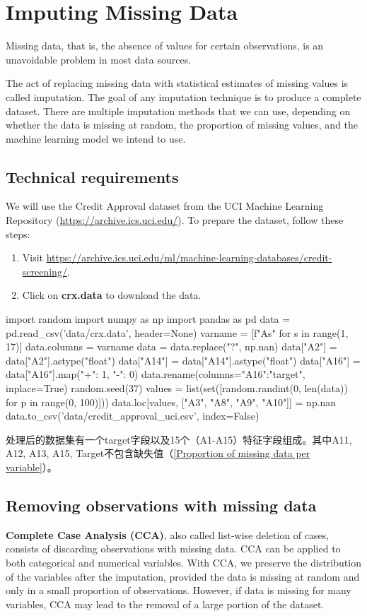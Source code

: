 \chapter{Imputing Missing Data}
Missing data, that is, the absence of values for certain observations, is an unavoidable problem in most data sources.

The act of replacing missing data with statistical estimates of missing values is called imputation.
The goal of any imputation technique is to produce a complete dataset. There are multiple imputation
methods that we can use, depending on whether the data is missing at random, the proportion of
missing values, and the machine learning model we intend to use.

\section{Technical requirements\label{credit_approval_uci}}
We will use the Credit Approval dataset from the UCI Machine Learning Repository (\url{https://archive.ics.uci.edu/}). To prepare the dataset, follow these steps:
\begin{enumerate}
    \item Visit \url{https://archive.ics.uci.edu/ml/machine-learning-databases/credit-screening/}.
    \item Click on \textbf{crx.data} to download the data.
\end{enumerate}
\begin{pyc}
import random
import numpy as np
import pandas as pd
data = pd.read_csv('data/crx.data', header=None)
varname = [f"A{s}" for s in range(1, 17)]
data.columns = varname
data = data.replace("?", np.nan)
data["A2"] = data["A2"].astype("float")
data["A14"] = data["A14"].astype("float")
data["A16"] = data["A16"].map({"+": 1, "-": 0})
data.rename(columns={"A16":"target"}, inplace=True)
random.seed(37)
values = list(set([random.randint(0, len(data)) for p in range(0, 100)]))
data.loc[values, ["A3", "A8", "A9", "A10"]] = np.nan
data.to_csv('data/credit_approval_uci.csv', index=False)
\end{pyc}


处理后的数据集有一个target字段以及15个（A1-A15）特征字段组成。其中A11, A12, A13, A15, Target不包含缺失值（\autoref{Proportion of missing data per variable}）。

\section{Removing observations with missing data}
\textbf{Complete Case Analysis (CCA)}, also called list-wise deletion of cases, consists of discarding observations
with missing data. CCA can be applied to both categorical and numerical variables. With CCA, we
preserve the distribution of the variables after the imputation, provided the data is missing at random
and only in a small proportion of observations. However, if data is missing for many variables, CCA
may lead to the removal of a large portion of the dataset.

